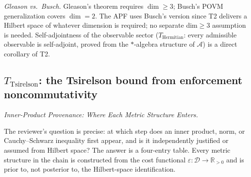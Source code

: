 \documentclass[11pt]{article}
\theoremstyle{remark}
\begin{document}
\smallskip\noindent\textit{Gleason vs.\ Busch.}  Gleason's theorem requires $\dim \ge 3$; Busch's POVM generalization covers $\dim = 2$.  The APF uses Busch's version since T2 delivers a Hilbert space of whatever dimension is required; no separate dim$\ge3$ assumption is needed.  Self-adjointness of the observable sector ($T_{\mathrm{Hermitian}}$: every admissible observable is self-adjoint, proved from the $*$-algebra structure of $\mathcal{A}$) is a direct corollary of T2.

\subsection{\texorpdfstring{$T_{\mathrm{Tsirelson}}$}{T Tsirelson}: the Tsirelson bound from enforcement noncommutativity}
\label{sec:T_Tsirelson}


\medskip\noindent\textit{Inner-Product Provenance: Where Each Metric Structure Enters.}

\noindent The reviewer's question is precise: at which step does an inner product, norm, or Cauchy--Schwarz inequality first appear, and is it independently justified or assumed from Hilbert space?  The answer is a four-entry table.  Every metric structure in the chain is constructed from the cost functional $\varepsilon: \mathcal{D} \to \mathbb{R}_{>0}$ and is prior to, not posterior to, the Hilbert-space identification.
\end{document}
